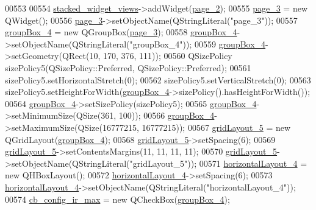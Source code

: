 \begin{DoxyCode}
00553 
00554         \hyperlink{a00080_a59e39bd3d716004e840a5be5dda18b96}{stacked\_widget\_views}->addWidget(\hyperlink{a00080_adcb6de4cebc6760fe319711f125010cc}{page\_2});
00555         \hyperlink{a00080_ac682cb2a9b686ca7c3d29771ad9ccb48}{page\_3} = \textcolor{keyword}{new} QWidget();
00556         \hyperlink{a00080_ac682cb2a9b686ca7c3d29771ad9ccb48}{page\_3}->setObjectName(QStringLiteral(\textcolor{stringliteral}{"page\_3"}));
00557         \hyperlink{a00080_ad8a919e5634add9c41bfc319cb9fd338}{groupBox\_4} = \textcolor{keyword}{new} QGroupBox(\hyperlink{a00080_ac682cb2a9b686ca7c3d29771ad9ccb48}{page\_3});
00558         \hyperlink{a00080_ad8a919e5634add9c41bfc319cb9fd338}{groupBox\_4}->setObjectName(QStringLiteral(\textcolor{stringliteral}{"groupBox\_4"}));
00559         \hyperlink{a00080_ad8a919e5634add9c41bfc319cb9fd338}{groupBox\_4}->setGeometry(QRect(10, 170, 376, 111));
00560         QSizePolicy sizePolicy5(QSizePolicy::Preferred, QSizePolicy::Preferred);
00561         sizePolicy5.setHorizontalStretch(0);
00562         sizePolicy5.setVerticalStretch(0);
00563         sizePolicy5.setHeightForWidth(\hyperlink{a00080_ad8a919e5634add9c41bfc319cb9fd338}{groupBox\_4}->sizePolicy().hasHeightForWidth());
00564         \hyperlink{a00080_ad8a919e5634add9c41bfc319cb9fd338}{groupBox\_4}->setSizePolicy(sizePolicy5);
00565         \hyperlink{a00080_ad8a919e5634add9c41bfc319cb9fd338}{groupBox\_4}->setMinimumSize(QSize(361, 100));
00566         \hyperlink{a00080_ad8a919e5634add9c41bfc319cb9fd338}{groupBox\_4}->setMaximumSize(QSize(16777215, 16777215));
00567         \hyperlink{a00080_a8731b71c513ff94baf59614807823c5d}{gridLayout\_5} = \textcolor{keyword}{new} QGridLayout(\hyperlink{a00080_ad8a919e5634add9c41bfc319cb9fd338}{groupBox\_4});
00568         \hyperlink{a00080_a8731b71c513ff94baf59614807823c5d}{gridLayout\_5}->setSpacing(6);
00569         \hyperlink{a00080_a8731b71c513ff94baf59614807823c5d}{gridLayout\_5}->setContentsMargins(11, 11, 11, 11);
00570         \hyperlink{a00080_a8731b71c513ff94baf59614807823c5d}{gridLayout\_5}->setObjectName(QStringLiteral(\textcolor{stringliteral}{"gridLayout\_5"}));
00571         \hyperlink{a00080_ae183387a7d233b437a637b403ba39ffd}{horizontalLayout\_4} = \textcolor{keyword}{new} QHBoxLayout();
00572         \hyperlink{a00080_ae183387a7d233b437a637b403ba39ffd}{horizontalLayout\_4}->setSpacing(6);
00573         \hyperlink{a00080_ae183387a7d233b437a637b403ba39ffd}{horizontalLayout\_4}->setObjectName(QStringLiteral(\textcolor{stringliteral}{"horizontalLayout\_4"}));
00574         \hyperlink{a00080_ae78fd3c777d081ab1ec1d0142bec3320}{cb\_config\_ir\_max} = \textcolor{keyword}{new} QCheckBox(\hyperlink{a00080_ad8a919e5634add9c41bfc319cb9fd338}{groupBox\_4});

\end{DoxyCode}
